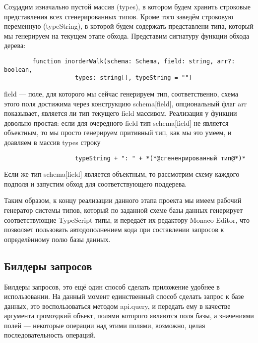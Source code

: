 \documentclass[12pt]{article}
\begin{document}
    Создадим изначально пустой массив (types), в котором будем хранить строковые представления всех сгенерированных типов. Кроме того заведём строковую
    переменную (typeString), в которой будем содержать представлени типа, который мы генерируем на текущем этапе обхода. Представим сигнатуру функции обхода дерева:
    \begin{lstlisting}
        function inorderWalk(schema: Schema, field: string, arr?: boolean,
                    types: string[], typeString = "")
    \end{lstlisting}
    field --- поле, для которого мы сейчас генерируем тип, соответственно, схема этого поля достижима через конструкцию schema$[$field$]$, опциональный
    флаг arr показывает, является ли тип текущего field массивом.
    Реализация у функции довольно простая: если для очередного field тип schema$[$field$]$ не является объектным, то мы просто генерируем
    притивный тип, как мы это умеем, и доавляем в массив types строку
    \begin{lstlisting}
                    typeString + ": " + *(*@сгененрированный тип@*)*
    \end{lstlisting}
    Если же тип schema$[$field$]$ является объектным, то рассмотрим схему каждого подполя и запустим обход для соответствующего поддерева.


    Таким образом, к концу реализации данного этапа проекта мы имеем рабочий генератор системы типов, который по заданной схеме базы данных генерирует
    соответствующие TypeScript-типы, и передаёт их редактору Monaco Editor, что позволяет пользовать автодополнением кода при составлении запросов
    к определённому полю базы данных.

    \subsection{Билдеры запросов}
    Билдеры запросов, это ещё один способ сделать приложение удобнее в использовании. На данный момент единственный способ сделать запрос к базе данных,
    это воспользоваться методом api.query, и передать ему в качестве аргумента громоздкий объект, полями которого являются поля базы, а значениями полей ---
    некоторые операции над этими полями, возможно, целая последовательность операций.
\end{document}
